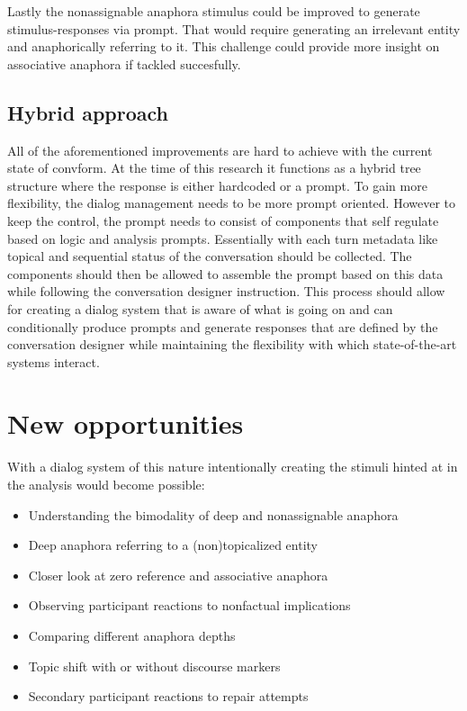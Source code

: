\documentclass[12pt]{report}
\begin{document}
{        Lastly the nonassignable anaphora stimulus could be improved to generate stimulus-responses via prompt.
        That would require generating an irrelevant entity and anaphorically referring to it.
        This challenge could provide more insight on associative anaphora if tackled succesfully.

    \subsection{Hybrid approach}

            All of the aforementioned improvements are hard to achieve with the current state of convform.
            At the time of this research it functions as a hybrid tree structure where the response is either
            hardcoded or a prompt.
            To gain more flexibility, the dialog management needs to be more prompt oriented.
            However to keep the control, the prompt needs to consist of components that self regulate based on
            logic and analysis prompts.
            Essentially with each turn metadata
            like topical and sequential status of the conversation should be collected.
            The components should then be allowed to assemble the prompt
            based on this data while following the conversation designer instruction.
            This process should allow for creating a dialog system that is aware of what is going on
            and can conditionally produce prompts and generate responses
            that are defined by the conversation designer
            while maintaining the flexibility with which state-of-the-art systems interact.

\section{New opportunities}

With a dialog system of this nature
intentionally creating the stimuli hinted at in the analysis would become possible:

    \begin{itemize}
    \item{Understanding the bimodality of deep and nonassignable anaphora}
    \item{Deep anaphora referring to a (non)topicalized entity}
    \item{Closer look at zero reference and associative anaphora}
    \item{Observing participant reactions to nonfactual implications}
    \item{Comparing different anaphora depths}
    \item{Topic shift with or without discourse markers}
    \item{Secondary participant reactions to repair attempts}
    \end{itemize}

}
\end{document}

